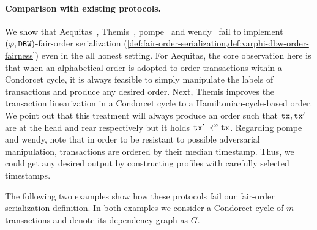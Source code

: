 \paragraph{Comparison with existing protocols.}
%
We show that \textsf{Aequitas}~\cite{C:KZGJ20}, \textsf{Themis}~\cite{CCS:KDLJK23}, \textsf{pompe}~\cite{OSDI:ZSCZA20} and \textsf{wendy}~\cite{AFT:Kursawe20} fail to implement $(\varphi, \mathtt{DBW})$-fair-order serialization (\cref{def:fair-order-serialization,def:varphi-dbw-order-fairness}) even in the all honest setting.
%
For \textsf{Aequitas}, the core observation here is that when an alphabetical order is adopted to order transactions within a Condorcet cycle, it is always feasible to simply manipulate the labels of transactions and produce any desired order.
%
Next, \textsf{Themis} improves the transaction linearization in a Condorcet cycle to a Hamiltonian-cycle-based order.
%
We point out that this treatment will always produce an order such that $\mathtt{tx}, \mathtt{tx}'$ are at the head and rear respectively but it holds $\mathtt{tx}' \prec^\varphi \mathtt{tx}$.
%
Regarding \textsf{pompe} and \textsf{wendy}, note that in order to be resistant to possible adversarial manipulation, transactions are ordered by their median timestamp.
%
Thus, we could get any desired output by constructing profiles with carefully selected timestamps.

The following two examples show how these protocols fail our fair-order serialization definition.
%
In both examples we consider a Condorcet cycle of $m$ transactions and denote its dependency graph as $G$.

